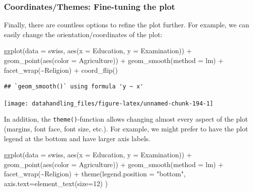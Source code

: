 \documentclass[
  12pt,
]{style/krantz}
\newenvironment{Shaded}{\begin{snugshade}}{\end{snugshade}}
\newcommand{\AttributeTok}[1]{\textcolor[rgb]{0.77,0.63,0.00}{#1}}
\newcommand{\DecValTok}[1]{\textcolor[rgb]{0.00,0.00,0.81}{#1}}
\newcommand{\FunctionTok}[1]{\textcolor[rgb]{0.00,0.00,0.00}{#1}}
\newcommand{\NormalTok}[1]{#1}
\newcommand{\SpecialCharTok}[1]{\textcolor[rgb]{0.00,0.00,0.00}{#1}}
\newcommand{\StringTok}[1]{\textcolor[rgb]{0.31,0.60,0.02}{#1}}
\begin{document}
\hypertarget{coordinatesthemes-fine-tuning-the-plot}{%
\subsubsection{Coordinates/Themes: Fine-tuning the plot}\label{coordinatesthemes-fine-tuning-the-plot}}

Finally, there are countless options to refine the plot further. For example, we can easily change the orientation/coordinates of the plot:

\begin{Shaded}
\begin{Highlighting}[]
\FunctionTok{ggplot}\NormalTok{(}\AttributeTok{data =}\NormalTok{ swiss, }\FunctionTok{aes}\NormalTok{(}\AttributeTok{x =}\NormalTok{ Education, }\AttributeTok{y =}\NormalTok{ Examination)) }\SpecialCharTok{+}
     \FunctionTok{geom\_point}\NormalTok{(}\FunctionTok{aes}\NormalTok{(}\AttributeTok{color =}\NormalTok{ Agriculture)) }\SpecialCharTok{+}
     \FunctionTok{geom\_smooth}\NormalTok{(}\AttributeTok{method =} \StringTok{\textquotesingle{}lm\textquotesingle{}}\NormalTok{) }\SpecialCharTok{+}
     \FunctionTok{facet\_wrap}\NormalTok{(}\SpecialCharTok{\textasciitilde{}}\NormalTok{Religion) }\SpecialCharTok{+}
     \FunctionTok{coord\_flip}\NormalTok{()}
\end{Highlighting}
\end{Shaded}

\begin{verbatim}
## `geom_smooth()` using formula 'y ~ x'
\end{verbatim}

\texttt{[image: datahandling\_files/figure-latex/unnamed-chunk-194-1]}

In addition, the \texttt{theme()}-function allows changing almost every aspect of the plot (margins, font face, font size, etc.). For example, we might prefer to have the plot legend at the bottom and have larger axis labels.

\begin{Shaded}
\begin{Highlighting}[]
\FunctionTok{ggplot}\NormalTok{(}\AttributeTok{data =}\NormalTok{ swiss, }\FunctionTok{aes}\NormalTok{(}\AttributeTok{x =}\NormalTok{ Education, }\AttributeTok{y =}\NormalTok{ Examination)) }\SpecialCharTok{+}
     \FunctionTok{geom\_point}\NormalTok{(}\FunctionTok{aes}\NormalTok{(}\AttributeTok{color =}\NormalTok{ Agriculture)) }\SpecialCharTok{+}
     \FunctionTok{geom\_smooth}\NormalTok{(}\AttributeTok{method =} \StringTok{\textquotesingle{}lm\textquotesingle{}}\NormalTok{) }\SpecialCharTok{+}
     \FunctionTok{facet\_wrap}\NormalTok{(}\SpecialCharTok{\textasciitilde{}}\NormalTok{Religion) }\SpecialCharTok{+}
     \FunctionTok{theme}\NormalTok{(}\AttributeTok{legend.position =} \StringTok{"bottom"}\NormalTok{, }\AttributeTok{axis.text=}\FunctionTok{element\_text}\NormalTok{(}\AttributeTok{size=}\DecValTok{12}\NormalTok{) )}
\end{Highlighting}
\end{Shaded}
\end{document}
